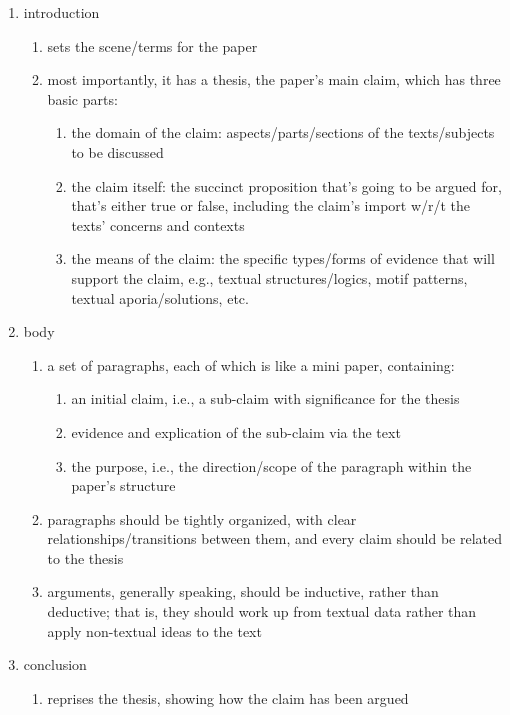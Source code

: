 \documentclass[12pt]{article}
\begin{document}
\begin{enumerate}
\item introduction
    \begin{enumerate}
    \item sets the scene/terms for the paper
    \item most importantly, it has a thesis, the paper’s main claim, which has three basic parts:
        \begin{enumerate}
        \item the domain of the claim: aspects/parts/sections of the texts/subjects to be discussed
        \item the claim itself: the succinct proposition that’s going to be argued for, that’s either true or false, including the claim’s import w/r/t the texts’ concerns and contexts
        \item the means of the claim: the specific types/forms of evidence that will support the claim, e.g., textual structures/logics, motif patterns, textual aporia/solutions, etc.
        \end{enumerate}
    \end{enumerate}
\item body
    \begin{enumerate}
    \item a set of paragraphs, each of which is like a mini paper, containing:
        \begin{enumerate}
        \item an initial claim, i.e., a sub-claim with significance for the thesis
        \item evidence and explication of the sub-claim via the text
        \item the purpose, i.e., the direction/scope of the paragraph within the paper’s structure
        \end{enumerate}
    \item paragraphs should be tightly organized, with clear relationships/transitions between them, and every claim should be related to the thesis
    \item arguments, generally speaking, should be inductive, rather than deductive; that is, they should work up from textual data rather than apply non-textual ideas to the text
    \end{enumerate}
\item conclusion
    \begin{enumerate}
    \item reprises the thesis, showing how the claim has been argued

\end{enumerate}
\end{enumerate}
\end{document}
